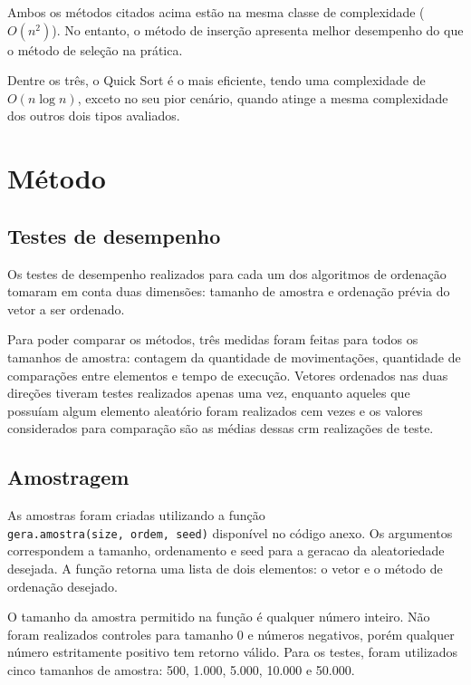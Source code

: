\documentclass[
]{article}
\begin{document}
Ambos os métodos citados acima estão na mesma classe de complexidade
(\(O(n^2)\)). No entanto, o método de inserção apresenta melhor
desempenho do que o método de seleção na prática.

Dentre os três, o Quick Sort é o mais eficiente, tendo uma complexidade
de \(O(n \log n)\), exceto no seu pior cenário, quando atinge a mesma
complexidade dos outros dois tipos avaliados.

\hypertarget{muxe9todo}{%
\section{Método}\label{muxe9todo}}

\hypertarget{testes-de-desempenho}{%
\subsection{Testes de desempenho}\label{testes-de-desempenho}}

Os testes de desempenho realizados para cada um dos algoritmos de
ordenação tomaram em conta duas dimensões: tamanho de amostra e
ordenação prévia do vetor a ser ordenado.

Para poder comparar os métodos, três medidas foram feitas para todos os
tamanhos de amostra: contagem da quantidade de movimentações, quantidade
de comparações entre elementos e tempo de execução. Vetores ordenados
nas duas direções tiveram testes realizados apenas uma vez, enquanto
aqueles que possuíam algum elemento aleatório foram realizados cem vezes
e os valores considerados para comparação são as médias dessas crm
realizações de teste.

\hypertarget{amostragem}{%
\subsection{Amostragem}\label{amostragem}}

As amostras foram criadas utilizando a função
\texttt{gera.amostra(size,\ ordem,\ seed)} disponível no código anexo.
Os argumentos correspondem a tamanho, ordenamento e seed para a geracao
da aleatoriedade desejada. A função retorna uma lista de dois elementos:
o vetor e o método de ordenação desejado.

O tamanho da amostra permitido na função é qualquer número inteiro. Não
foram realizados controles para tamanho 0 e números negativos, porém
qualquer número estritamente positivo tem retorno válido. Para os
testes, foram utilizados cinco tamanhos de amostra: 500, 1.000, 5.000,
10.000 e 50.000.
\end{document}

